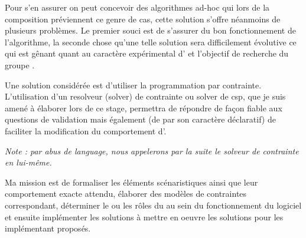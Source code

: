 Pour s'en assurer on peut concevoir des algorithmes ad-hoc qui lors de la composition préviennent ce genre de cas, cette solution s'offre néanmoins de plusieurs problèmes. Le premier souci est de s'assurer du bon fonctionnement de l'algorithme, la seconde chose qu'une telle solution sera difficilement évolutive ce qui est gênant quant au caractère expérimental d'\iscore{} et l'objectif de recherche du groupe \ossia{}.

Une solution considérée est d'utiliser la programmation par contrainte. L'utilisation d'un resolveur (solver) de contrainte ou solver de \acrshort{csp}, que je suis amené à élaborer lors de ce stage, permettra de répondre de façon fiable aux questions de validation mais également (de par son caractère déclaratif) de faciliter la modification du comportement d'\iscore{}.

\emph{Note : par abus de language, nous appelerons par la suite \csp{} le solveur de contrainte en lui-même.}

Ma mission est de formaliser les éléments scénaristiques ainsi que leur comportement exacte attendu, élaborer des modèles de contraintes correspondant, déterminer le ou les rôles du \csp{} au sein du fonctionnement du logiciel et ensuite implémenter les solutions à mettre en oeuvre les solutions pour les implémentant proposés.

\printglossary[type=\acronymtype]
 
\printglossary